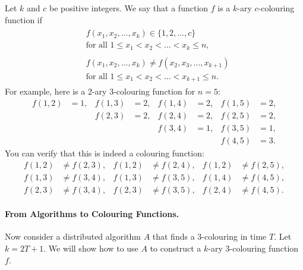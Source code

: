 Let $k$ and $c$ be positive integers. We say that a function $f$ is a $k$-ary $c$-colouring function if
\begin{align}
    \begin{split}
    &f(x_1, x_2, \dotsc, x_k) \in \{1,2,\dotsc,c\} \\
    &\text{for all } 1 \le x_1 < x_2 < \dotso < x_k \le n,
    \end{split}
    \label{eq:linial-col1} \\[3pt]
    \begin{split}
    &f(x_1, x_2, \dotsc, x_k) \ne f(x_2, x_3, \dotsc, x_{k+1}) \\
    &\text{for all } 1 \le x_1 < x_2 < \dotso < x_{k+1} \le n.
    \end{split}
    \label{eq:linial-col2}
\end{align}
For example, here is a $2$-ary $3$-colouring function for $n = 5$:
\begin{align*}
    f(1,2) &= 1, &
    f(1,3) &= 2, &
    f(1,4) &= 2, &
    f(1,5) &= 2, \\&&
    f(2,3) &= 2, &
    f(2,4) &= 2, &
    f(2,5) &= 2, \\&&&&
    f(3,4) &= 1, &
    f(3,5) &= 1, \\&&&&&&
    f(4,5) &= 3.
\end{align*}
You can verify that this is indeed a colouring function:
\begin{align*}
    f(1,2) &\ne f(2,3), &
    f(1,2) &\ne f(2,4), &
    f(1,2) &\ne f(2,5), \\
    f(1,3) &\ne f(3,4), &
    f(1,3) &\ne f(3,5), &
    f(1,4) &\ne f(4,5), \\
    f(2,3) &\ne f(3,4), &
    f(2,3) &\ne f(3,5), &
    f(2,4) &\ne f(4,5).
\end{align*}


\paragraph{From Algorithms to Colouring Functions.}

Now consider a distributed algorithm $A$ that finds a $3$-colouring in time $T$. Let $k = 2T+1$. We will show how to use $A$ to construct a $k$-ary $3$-colouring function $f$.

